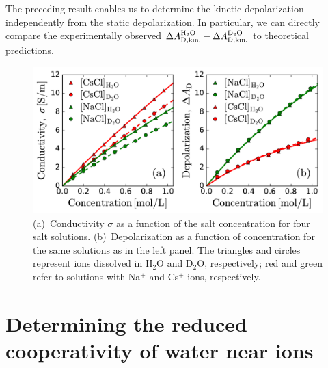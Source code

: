 The preceding result enables us to determine the kinetic depolarization independently from the static depolarization. In particular, we can directly compare the experimentally observed $\Delta A_{\rm D,kin.}^{\rm H_2O}-\Delta A_{\rm D,kin.}^{\rm D_2O}$ to theoretical predictions.  




\begin{figure}[t!]
	\centering
	\includegraphics[width=0.85\figwidth]{chapters/Chapter4_PRL/Graphs/Conductivity_and_Depolarization.pdf}
	\caption{(a)~Conductivity $\sigma$ as a function of the salt concentration for four salt solutions. (b)~Depolarization as a function of concentration for the same solutions as in the left panel. The triangles and circles represent ions dissolved  in H$_2$O and D$_2$O, respectively; red and green refer to solutions with Na$^+$ and Cs$^+$ ions, respectively.}
	\label{fig2_Chap4}
\end{figure}

\section{Determining the reduced cooperativity of water near ions}




